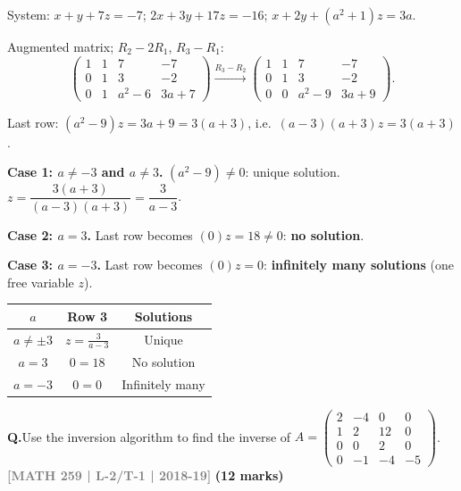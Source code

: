 \documentclass[12pt,a3paper]{article}
\newcommand{\yr}[1]{\hfill\textcolor{gray}{\small\textbf{[#1]}}}
\newcommand{\mk}[1]{\textcolor{orange!70!black}{\small\textbf{(#1 marks)}}}
\newcounter{qnum}
\newcommand{\Q}[1]{%
  \needspace{4\baselineskip}
  \refstepcounter{qnum}
  \vspace{6pt}
  \noindent\textbf{Q\theqnum.}\enspace #1\par
}
\begin{document}
\begin{tcolorbox}[enhanced,breakable,
  colback=cB!4,colframe=cB,boxrule=0.8pt,arc=5pt,
  title={\textbf{Answer --- Values of $a$: No/Unique/Infinitely Many Solutions}},
  fonttitle=\bfseries\color{white},colbacktitle=cB]

System: $x+y+7z=-7$;\; $2x+3y+17z=-16$;\; $x+2y+(a^2+1)z=3a$.

Augmented matrix; $R_2-2R_1$, $R_3-R_1$:
\[
\begin{pmatrix}1&1&7&-7\\0&1&3&-2\\0&1&a^2-6&3a+7\end{pmatrix}
\xrightarrow{R_3-R_2}
\begin{pmatrix}1&1&7&-7\\0&1&3&-2\\0&0&a^2-9&3a+9\end{pmatrix}.
\]

Last row: $(a^2-9)z = 3a+9 = 3(a+3)$, i.e.\ $(a-3)(a+3)z = 3(a+3)$.

\textbf{Case 1: $a\neq-3$ and $a\neq3$.} $(a^2-9)\neq0$: unique solution. $z=\dfrac{3(a+3)}{(a-3)(a+3)}=\dfrac{3}{a-3}$.

\textbf{Case 2: $a=3$.} Last row becomes $(0)z=18\neq0$: \textbf{no solution}.

\textbf{Case 3: $a=-3$.} Last row becomes $(0)z=0$: \textbf{infinitely many solutions} (one free variable $z$).

\begin{center}
\small\begin{tabular}{@{}ccc@{}}
\toprule
$a$ & Row 3 & Solutions \\
\midrule
$a\neq\pm3$ & $z=\frac{3}{a-3}$ & Unique \\
$a=3$  & $0=18$ & No solution \\
$a=-3$ & $0=0$  & Infinitely many \\
\bottomrule
\end{tabular}
\end{center}

\end{tcolorbox}


\Q{Use the inversion algorithm to find the inverse of $A = \begin{pmatrix} 2 & -4 & 0 & 0 \\ 1 & 2 & 12 & 0 \\ 0 & 0 & 2 & 0 \\ 0 & -1 & -4 & -5 \end{pmatrix}$.
\yr{MATH 259 | L-2/T-1 | 2018-19} \mk{12}}
\end{document}
